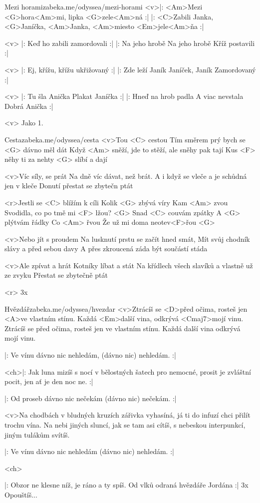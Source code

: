\begin{song}[Čechomor]{58}{Mezi horami}{zabeka.me/odyssea/mezi-horami}
	<v>|: <Am>Mezi <G>hora<Am>mi, lipka <G>zele<Am>ná :|
	|: <C>Zabili Janka, <G>Janíčka, <Am>Janka, <Am>miesto <Em>jele<Am>ňa :|

	<v> |: Keď ho zabili
	zamordovali :|
	|: Na jeho hrobě
	Na jeho hrobě
	Kříž postavili :|

	<v> |: Ej, křížu, křížu
	ukřižovaný :|
	|: Zde leží Janík
	Janíček, Janík
	Zamordovaný :|

	<v> |: Tu šla Anička
	Plakat Janíčka :|
	|: Hneď na hrob padla
	A viac nevstala
	Dobrá Anička :|

	<v> Jako 1.
\end{song}
\begin{song}[Kryštof]{59}{Cesta}{zabeka.me/odyssea/cesta}
	<v>Tou <C> cestou
	Tím směrem prý bych se <G> dávno měl dát
	Když <Am> sněží, jde to stěží, ale sněhy pak tají
	Kus <F> něhy ti za nehty <G> slíbí a dají

	<v>Víc síly, se prát
	Na dně víc dávat, než brát.
	A i když se vleče a je schůdná jen v kleče
	Donutí přestat se zbytečn ptát

	<r>Jestli se <C> blížím k cíli
	Kolik <G> zbývá víry
	Kam <Am> zvou
	Svodidla, co po tmě mi <F> lžou? <G>
	Snad <C> couvám zpátky
	A <G> plýtvám řádky
	Co <Am> řvou
	Že už mi doma neotev<F>řou <G>

	<v>Nebo jít s proudem
	Na lusknutí prstu se začít hned smát,
	Mít svůj chodník slávy a před sebou davy
	A přes zkroucená záda být součástí stáda

	<v>Ale zpívat a hrát
	Kotníky líbat a stát
	Na křídlech všech slavíků a vlastně už ze zvyku
	Přestat se zbytečně ptát

	<r>
	3x
\end{song}
\begin{song}[UDG]{60}{Hvězdář}{zabeka.me/odyssea/hvezdar}
	<v>Ztrácíš se <D>před očima, rosteš jen <A>ve vlastním stínu.
	Každá <Em>další vina, odkrývá <Cmaj7>mojí vinu.
	Ztrácíš se před očima, rosteš jen ve vlastním stínu.
	Každá další vina odkrývá mojí vinu.

	|: Ve vínu dávno nic nehledám, (dávno nic) nehledám. :|

	<ch>|: Jak luna mizíš s nocí v bělostných šatech pro nemocné,
	prosit je zvláštní pocit, jen ať je den noc ne. :|

	|: Od proseb dávno nic nečekám (dávno nic) nečekám. :|

	<v>Na chodbách v bludných kruzích zářivka vyhasíná,
	já ti do infuzí chci přilít trochu vína.
	Na nebi jiných sluncí, jak se tam asi cítíš,
	s nebeskou interpunkcí, jiným tulákům svítíš.

	|: Ve vínu dávno nic nehledám (dávno nic) nehledám. :|

	<ch>

	|: Obzor ne klesne níž, je ráno a ty spíš.
	Od vlků odraná hvězdáře Jordána :| 3x
	Opouštíš...
\end{song}
